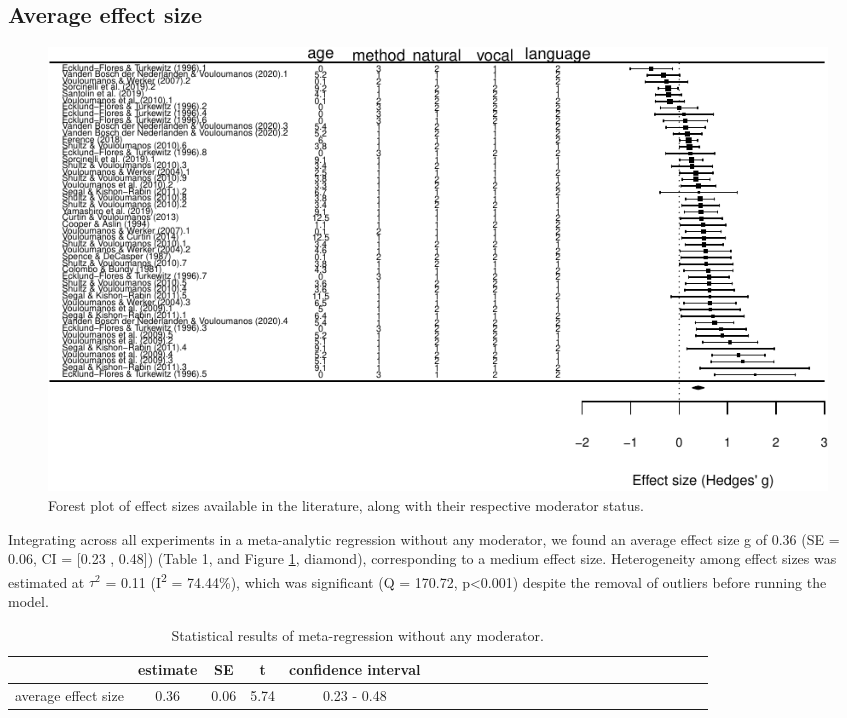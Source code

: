 \documentclass[man]{apa6}
\begin{document}
\subsection{Average effect size}\label{average-effect-size}

\begin{figure}
\centering
\includegraphics{MA_speech_pref_files/figure-latex/forest-1.pdf}
\caption{\label{fig:forest}Forest plot of effect sizes available in the
literature, along with their respective moderator status.}
\end{figure}

Integrating across all experiments in a meta-analytic regression without
any moderator, we found an average effect size g of 0.36 (SE = 0.06, CI
= {[}0.23 , 0.48{]}) (Table 1, and Figure \ref{tab:Table1}, diamond),
corresponding to a medium effect size. Heterogeneity among effect sizes
was estimated at \(\tau^2\) = 0.11 (I\textsuperscript{2} = 74.44\%),
which was significant (Q = 170.72, p\textless{}0.001) despite the
removal of outliers before running the model.

\begin{table}[tbp]
\begin{center}
\begin{threeparttable}
\caption{\label{tab:Table1}Statistical results of meta-regression without any moderator.}
\begin{tabular}{lcccclcccclcccclcccclcccc}
\toprule
 & estimate & SE & t & confidence interval\\
\midrule
average effect size & 0.36 & 0.06 & 5.74 & 0.23 - 0.48\\
\bottomrule
\end{tabular}
\end{threeparttable}
\end{center}
\end{table}
\end{document}

